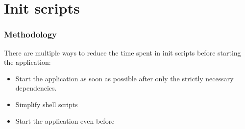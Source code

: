 \section{Init scripts}
\begin{frame}
\frametitle{Methodology}
There are multiple ways to reduce the time spent in init scripts before
starting the application:
\begin{itemize}
	\item Start the application as soon as possible after only the
              strictly necessary dependencies.
  	\item Simplify shell scripts
	\item Start the application even before 
\end{itemize}
\end{frame}


